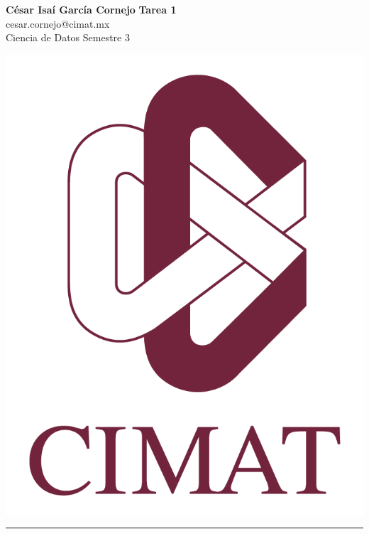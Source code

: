 \documentclass[a4paper, 11pt]{article}
\begin{document}
	\noindent
	
	\begin{minipage}[b][1.2cm][t]{0.8\textwidth}
		\large\textbf{César Isaí García Cornejo} \hfill \textbf{Tarea 1}  \\
		cesar.cornejo@cimat.mx \hfill \\
		\normalsize Ciencia de Datos \hfill Semestre 3\\
	\end{minipage}
	
	\hspace{14.4cm}
	\begin{minipage}[b][0.03cm][t]{0.12\linewidth}
		
		\vspace{-2.2cm}
		\includegraphics[scale=0.3]{Images/EscudoCimat.png}
	\end{minipage}
	
	\noindent\rule{7in}{2.8pt}
	
\end{document}
